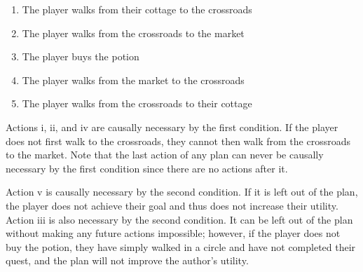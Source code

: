 \documentclass[letterpaper]{article} %
\begin{document}
\begin{enumerate}[i]
  \item The player walks from their cottage to the crossroads
  \item The player walks from the crossroads to the market
  \item The player buys the potion
  \item The player walks from the market to the crossroads
  \item The player walks from the crossroads to their cottage
\end{enumerate}

Actions i, ii, and iv are causally necessary by the first condition. If the player does not first walk to the crossroads, they cannot then walk from the crossroads to the market. Note that the last action of any plan can never be causally necessary by the first condition since there are no actions after it.

Action v is causally necessary by the second condition. If it is left out of the plan, the player does not achieve their goal and thus does not increase their utility. Action iii is also necessary by the second condition. It can be left out of the plan without making any future actions impossible; however, if the player does not buy the potion, they have simply walked in a circle and have not completed their quest, and the plan will not improve the author's utility.


\end{document}
